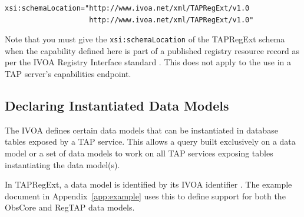 \documentclass{ivoa}
\begin{document}
\begin{verbatim}
xsi:schemaLocation="http://www.ivoa.net/xml/TAPRegExt/v1.0
                    http://www.ivoa.net/xml/TAPRegExt/v1.0"
\end{verbatim}

Note that you must give the \texttt{xsi:schemaLocation} of
the TAPRegExt schema when the capability defined here is part of a published
registry resource record as per the IVOA Registry Interface standard 
\citep{2018ivoa.spec.0723D}.  This does not apply to the use
in a TAP server's capabilities endpoint.


\subsection{Declaring Instantiated Data Models}

\label{dms}

The IVOA defines certain data models that can be instantiated in database
tables exposed by a TAP service.  This allows a query built exclusively
on a data model or a set of data models to work on all TAP services exposing
tables instantiating the data model(s).

In TAPRegExt, a data model is identified by its IVOA identifier
\citep{2016ivoa.spec.0523D}.  The example document in Appendix~\ref{app:example}
uses this to define support for both the ObsCore and RegTAP data models.
\end{document}
